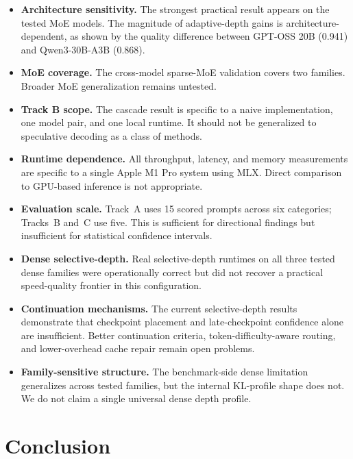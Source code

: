 \documentclass[11pt]{article}
\begin{document}
\begin{itemize}
\item \textbf{Architecture sensitivity.} The strongest practical result appears on the tested MoE models. The magnitude of adaptive-depth gains is architecture-dependent, as shown by the quality difference between GPT-OSS 20B (0.941) and Qwen3-30B-A3B (0.868).

\item \textbf{MoE coverage.} The cross-model sparse-MoE validation covers two families. Broader MoE generalization remains untested.

\item \textbf{Track B scope.} The cascade result is specific to a naive implementation, one model pair, and one local runtime. It should not be generalized to speculative decoding as a class of methods.

\item \textbf{Runtime dependence.} All throughput, latency, and memory measurements are specific to a single Apple M1 Pro system using MLX. Direct comparison to GPU-based inference is not appropriate.

\item \textbf{Evaluation scale.} Track~A uses 15 scored prompts across six categories; Tracks~B and~C use five. This is sufficient for directional findings but insufficient for statistical confidence intervals.

\item \textbf{Dense selective-depth.} Real selective-depth runtimes on all three tested dense families were operationally correct but did not recover a practical speed-quality frontier in this configuration.

\item \textbf{Continuation mechanisms.} The current selective-depth results demonstrate that checkpoint placement and late-checkpoint confidence alone are insufficient. Better continuation criteria, token-difficulty-aware routing, and lower-overhead cache repair remain open problems.

\item \textbf{Family-sensitive structure.} The benchmark-side dense limitation generalizes across tested families, but the internal KL-profile shape does not. We do not claim a single universal dense depth profile.
\end{itemize}

\section{Conclusion}
\end{document}
